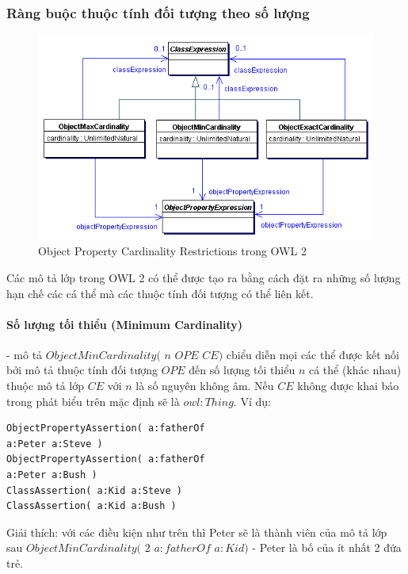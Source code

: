 \subsubsection{Ràng buộc thuộc tính đối tượng theo số lượng}
\begin{figure}[h]
	\centering
	\includegraphics[width=120mm]{Figures/ce_2.png}
	\caption{Object Property Cardinality Restrictions trong OWL 2\label{overflow}}
\end{figure}
Các mô tả lớp trong OWL 2 có thể được tạo ra bằng cách đặt ra những số lượng hạn chế các cá thể mà các thuộc tính đối tượng có thể liên kết.
\paragraph{Số lượng tối thiểu (Minimum Cardinality)} - mô tả $ ObjectMinCardinality($ $n$ $OPE$  $CE)$ cbiểu diễn mọi các thể được kết nối bởi mô tả thuộc tính đối tượng $OPE$ đến số lượng tối thiểu $n$ cá thể (khác nhau) thuộc mô tả lớp $CE$ với $n$ là số nguyên không âm. Nếu $CE$ không được khai báo trong phát biểu trên mặc định sẽ là $owl:Thing$. Ví dụ:
\begin{verbatim}
ObjectPropertyAssertion( a:fatherOf 
a:Peter a:Steve )
ObjectPropertyAssertion( a:fatherOf 
a:Peter a:Bush )
ClassAssertion( a:Kid a:Steve )
ClassAssertion( a:Kid a:Bush )
\end{verbatim}
Giải thích: với các điều kiện như trên thì Peter sẽ là thành viên của mô tả lớp sau 
$ObjectMinCardinality($ $2$ $a:fatherOf$ $a:Kid)$ - Peter là bố của ít nhất 2 đứa trẻ.

